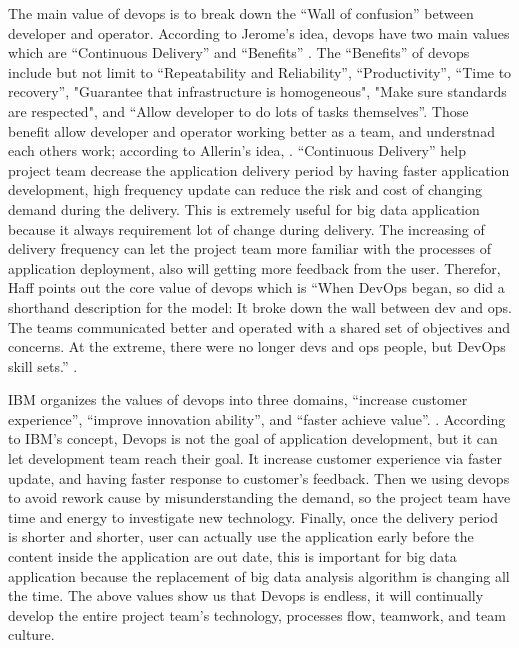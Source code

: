 \documentclass[sigconf]{acmart}
\begin{document}
The main value of devops is to break down the ``Wall of confusion'' between developer and operator. According to Jerome's idea, devops have two main values which are “Continuous Delivery” and “Benefits” \cite{devops:01} . The ``Benefits'' of devops include but not limit to ``Repeatability and Reliability'', ``Productivity'', ``Time to recovery'', "Guarantee that infrastructure is homogeneous", "Make sure standards are respected", and ``Allow developer to do lots of tasks themselves''. Those benefit allow developer and operator working better as a team, and understnad each others work; according to Allerin's idea, . ``Continuous Delivery'' help project team decrease the application delivery period by having faster application development, high frequency update can reduce the risk and cost of changing demand during the delivery. This is extremely useful for big data application because it always requirement lot of change during delivery. The increasing of delivery frequency can let the project team more familiar with the processes of application deployment, also will getting more feedback from the user. Therefor, Haff points out the core value of devops which is ``When DevOps began, so did a shorthand description for the model: It broke down the wall between dev and ops. The teams communicated better and operated with a shared set of objectives and concerns. At the extreme, there were no longer devs and ops people, but DevOps skill sets.'' \cite{devops:05}.

IBM organizes the values of devops into three domains, ``increase customer experience'', ``improve innovation ability'', and ``faster achieve value''. \cite{IBM:01}. According to IBM's concept, Devops is not the goal of application development, but it can let development team reach their goal. It increase customer experience via faster update, and having faster response to customer's feedback. Then we using devops to avoid rework cause by misunderstanding the demand, so the project team have time and  energy to investigate new technology. Finally, once the delivery period is shorter and shorter, user can actually use the application early before the content inside the application are out date, this is important for big data application because the replacement of big data analysis algorithm is changing all the time. The above values show us that Devops is endless, it will continually develop the entire project team's technology, processes flow, teamwork, and team culture. 
\end{document}
